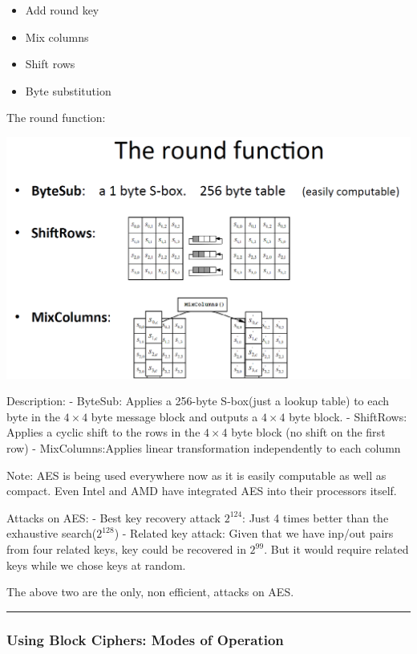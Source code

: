 \documentclass[11pt]{article}
\makeatletter
\def\maxwidth{\ifdim\Gin@nat@width>\linewidth\linewidth
    \else\Gin@nat@width\fi}
\let\Oldincludegraphics\includegraphics
\renewcommand{\includegraphics}[1]{\Oldincludegraphics[width=.8\maxwidth]{#1}}
\providecommand{\tightlist}{%
      \setlength{\itemsep}{0pt}\setlength{\parskip}{0pt}}
\makeatother
\begin{document}
\begin{itemize}
\tightlist
\item
  Add round key
\item
  Mix columns
\item
  Shift rows
\item
  Byte substitution
\end{itemize}

The round function:

\includegraphics{./Images/AES-Round.png}

Description: - ByteSub: Applies a 256-byte S-box(just a lookup table) to
each byte in the \(4\times 4\) byte message block and outputs a
\(4\times 4\) byte block. - ShiftRows: Applies a cyclic shift to the
rows in the \(4\times 4\) byte block (no shift on the first row) -
MixColumns:Applies linear transformation independently to each column

Note: AES is being used everywhere now as it is easily computable as
well as compact. Even Intel and AMD have integrated AES into their
processors itself.

Attacks on AES: - Best key recovery attack \(2^{124}\): Just 4 times
better than the exhaustive search(\(2^{128}\)) - Related key attack:
Given that we have inp/out pairs from four related keys, key could be
recovered in \(2^{99}\). But it would require related keys while we
chose keys at random.

The above two are the only, non efficient, attacks on AES.

\begin{center}\rule{0.5\linewidth}{\linethickness}\end{center}

    \hypertarget{using-block-ciphers-modes-of-operation}{%
\subsubsection{Using Block Ciphers: Modes of
Operation}\label{using-block-ciphers-modes-of-operation}}
\end{document}
